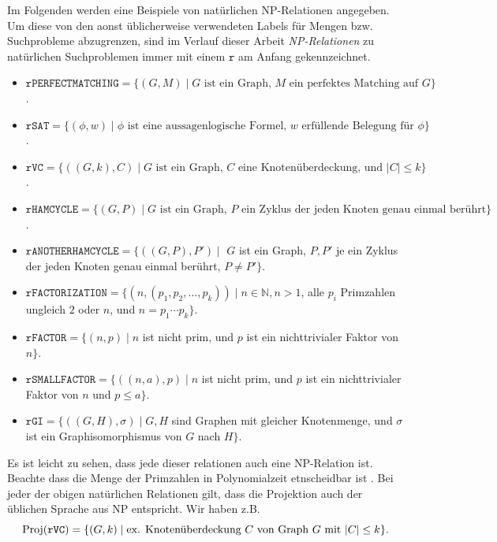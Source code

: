 Im Folgenden werden eine Beispiele von natürlichen NP-Relationen angegeben. Um diese von den aonst üblicherweise verwendeten Labels für Mengen bzw. Suchprobleme abzugrenzen, sind im Verlauf dieser Arbeit \emph{NP-Relationen} zu natürlichen Suchproblemen immer mit einem $\mathtt{r}$ am Anfang gekennzeichnet.
\begin{itemize}
\item $\mathtt{rPERFECTMATCHING} = \{ (G, M) \mid \text{$G$ ist ein Graph, $M$ ein perfektes Matching auf $G$} \}$.
\item $\mathtt{rSAT} = \{ (\phi, w) \mid \text{$\phi$ ist eine aussagenlogische Formel, $w$ erfüllende Belegung für $\phi$} \}$.
\item $\mathtt{rVC} = \{ ((G, k), C) \mid \text{$G$ ist ein Graph, $C$ eine Knotenüberdeckung, und $|C|\leq k$} \}$.
\item $\mathtt{rHAMCYCLE} = \{ (G, P) \mid \text{$G$ ist ein Graph, $P$ ein Zyklus der jeden Knoten genau einmal berührt} \}$.
\item $\mathtt{rANOTHERHAMCYCLE} = \{ ((G, P), P') \mid $ $G$ ist ein Graph, $P, P'$ je ein Zyklus der jeden Knoten genau einmal berührt, $P\neq P' \}$.
\item $\mathtt{rFACTORIZATION} = \{ (n, (p_1,p_2,\dots, p_k)) \mid n\in\mathbb N, n>1$, alle $p_i$ Primzahlen ungleich $2$ oder $n$, und $n=p_1\cdots p_k \}$.
\item $\mathtt{rFACTOR} = \{ (n, p) \mid n$ ist nicht prim, und $p$ ist ein nichttrivialer Faktor von $n\}$.
\item $\mathtt{rSMALLFACTOR} = \{ ((n, a), p) \mid n$ ist nicht prim, und $p$ ist ein nichttrivialer Faktor von $n$ und $p\leq a\}$.
\item $\mathtt{rGI} = \{ ((G, H), \sigma) \mid G, H$ sind Graphen mit gleicher Knotenmenge, und $\sigma$ ist ein Graphisomorphismus von $G$ nach $H\}$.
\end{itemize}
Es ist leicht zu sehen, dass jede dieser relationen auch eine NP-Relation ist. Beachte dass die Menge der Primzahlen in Polynomialzeit etnscheidbar ist \textcite{agrawal_primes_2004}.
Bei jeder der obigen natürlichen Relationen gilt, dass die Projektion auch der üblichen Sprache aus NP entspricht. Wir haben z.B.
\[ \operatorname{Proj}(\mathtt{rVC}) = \{ (G, k) \mid \text{ex. Knotenüberdeckung $C$ von Graph $G$ mit $|C|\leq k$} \}. \]

